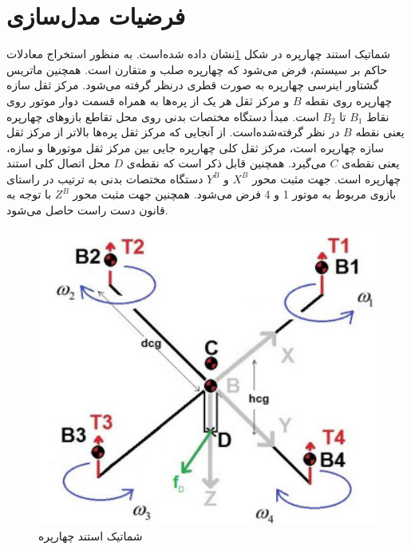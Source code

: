 \section{فرضیات مدل‌سازی}
شماتیک استند چهارپره در شكل \ref{QuadAssum}نشان داده شده‌است. به ‌منظور استخراج معادلات حاکم بر سیستم، 
فرض می‌شود که چهارپره صلب و متقارن است. همچنین ماتریس گشتاور اینرسی چهارپره به صورت قطری درنظر گرفته می‌شود. مرکز ثقل سازه چهارپره روی نقطه $B$ و مرکز ثقل هر یک از پره‌ها به همراه قسمت دوار موتور روی نقاط 
$B_1$
تا
$B_2$
است. مبدأ دستگاه مختصات بدنی روی محل تقاطع بازوهای چهارپره یعنی نقطه 
$B$
در نظر گرفته‌شده‌است. از آنجایی ‌که مرکز ثقل پره‌ها بالاتر از مرکز ثقل سازه چهارپره است، مرکز ثقل کلی چهارپره جایی بین مرکز ثقل موتورها و سازه، یعنی نقطه‌ی 
$C$
می‌گیرد. همچنین قابل ذکر است که نقطه‌ی
$D$
محل اتصال کلی استند چهارپره است. جهت مثبت محور 
$X^B$
و
$Y^B$
دستگاه مختصات بدنی به ترتیب در راستای بازوی مربوط به موتور 1 و 4 فرض می‌شود. همچنین جهت مثبت محور
$Z^B$
با توجه به قانون دست راست حاصل می‌شود.
\begin{figure}[H]\label{QuadAssum}
	\includegraphics[width=12cm]{figs/Quad/StandAssumations.jpg}
	\centering
	\caption{شماتیک استند چهارپره\cite{Abeshtan}}
\end{figure}
 